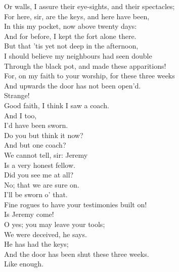 \documentclass[a4paper,oneside]{memoir}
\begin{document}
\begin{drama*}
Or walls, I assure their eye-sights, and their spectacles;\\
For here, sir, are the keys, and here have been,\\
In this my pocket, now above twenty days:\\
And for before, I kept the fort alone there.\\
But that 'tis yet not deep in the afternoon,\\
I should believe my neighbours had seen double\\
Through the black pot, and made these apparitions!\\
For, on my faith to your worship, for these three weeks\\
And upwards the door has not been open'd.\\
\lovewitspeaks Strange!\\
\neighonespeaks {} Good faith, I think I saw a coach.\\
\neightwospeaks {} And I too,\\
I'd have been sworn.\\
\lovewitspeaks {} Do you but think it now?\\
And but one coach?\\
\neighfourspeaks {} We cannot tell, sir: Jeremy\\
Is a very honest fellow.\\
\facespeaks {} Did you see me at all?\\
\neighonespeaks No; that we are sure on.\\
\neightwospeaks {} I'll be sworn o' that.\\
\lovewitspeaks Fine rogues to have your testimonies built on!\\
\neighthreespeaks Is Jeremy come!\\
\neighonespeaks {} O yes; you may leave your tools;\\
We were deceived, he says.\\
\neightwospeaks {} He has had the keys;\\
And the door has been shut these three weeks.\\
\neighthreespeaks {} Like enough.\\

\end{drama*}
\end{document}
